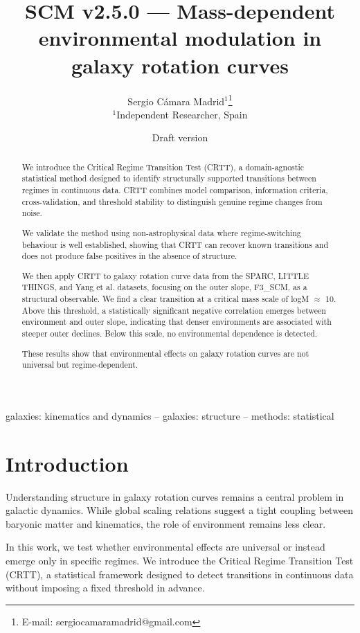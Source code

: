 \documentclass[fleqn,usenatbib]{mnras}
\title[SCM v2.5.0]{SCM v2.5.0 --- Mass-dependent environmental modulation in galaxy rotation curves}
\author[S. Cámara Madrid]{
Sergio Cámara Madrid$^{1}$\thanks{E-mail: sergiocamaramadrid@gmail.com}\\
$^{1}$Independent Researcher, Spain
}
\date{Draft version}
\begin{document}
\maketitle

\begin{abstract}
We introduce the Critical Regime Transition Test (CRTT), a domain-agnostic statistical method designed to identify structurally supported transitions between regimes in continuous data. CRTT combines model comparison, information criteria, cross-validation, and threshold stability to distinguish genuine regime changes from noise.

We validate the method using non-astrophysical data where regime-switching behaviour is well established, showing that CRTT can recover known transitions and does not produce false positives in the absence of structure.

We then apply CRTT to galaxy rotation curve data from the SPARC, LITTLE THINGS, and Yang et al. datasets, focusing on the outer slope, F3\_SCM, as a structural observable. We find a clear transition at a critical mass scale of logM $\approx$ 10. Above this threshold, a statistically significant negative correlation emerges between environment and outer slope, indicating that denser environments are associated with steeper outer declines. Below this scale, no environmental dependence is detected.

These results show that environmental effects on galaxy rotation curves are not universal but regime-dependent.
\end{abstract}

\begin{keywords}
galaxies: kinematics and dynamics -- galaxies: structure -- methods: statistical
\end{keywords}

\section{Introduction}

Understanding structure in galaxy rotation curves remains a central problem in galactic dynamics. While global scaling relations suggest a tight coupling between baryonic matter and kinematics, the role of environment remains less clear.

In this work, we test whether environmental effects are universal or instead emerge only in specific regimes. We introduce the Critical Regime Transition Test (CRTT), a statistical framework designed to detect transitions in continuous data without imposing a fixed threshold in advance.
\end{document}
